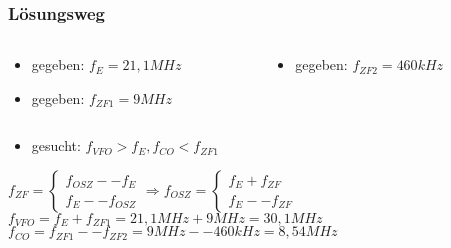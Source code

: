 \begin{frame}
\frametitle{Lösungsweg}
\begin{columns}
    \begin{column}{0.48\textwidth}
    \begin{itemize}
  \item gegeben: $f_{E} = 21,1MHz$
  \item gegeben: $f_{ZF1} = 9MHz$
  \end{itemize}

    \end{column}
   \begin{column}{0.48\textwidth}
       \begin{itemize}
  \item gegeben: $f_{ZF2} = 460kHz$
  \end{itemize}

   \end{column}
\end{columns}

\begin{itemize}
  \item gesucht: $f_{VFO} \gt f_E, f_{CO} \lt f_{ZF1}$
  \end{itemize}
    \pause
    $f_{ZF} = \begin{cases}f_{OSZ} -- f_E\\ f_E -- f_{OSZ}\end{cases} \Rightarrow f_{OSZ} = \begin{cases}f_E + f_{ZF}\\ f_E -- f_{ZF}\end{cases}$
    \pause
    $f_{VFO} = f_E + f_{ZF1} = 21,1MHz + 9MHz = 30,1MHz$
    \pause
    $f_{CO} = f_{ZF1} -- f_{ZF2} = 9MHz -- 460kHz = 8,54MHz$



\end{frame}


